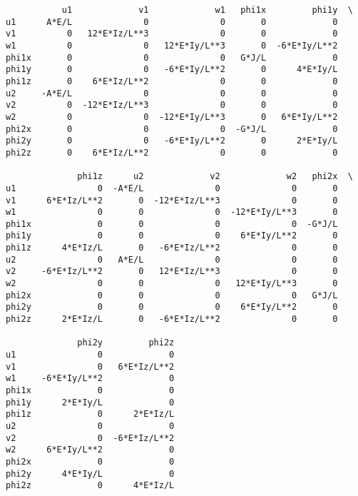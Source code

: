 \documentclass[12pt,fleqn]{article}\usepackage{../../common}
\begin{document}
\begin{verbatim}
           u1             v1             w1   phi1x         phi1y  \
u1      A*E/L              0              0       0             0   
v1          0   12*E*Iz/L**3              0       0             0   
w1          0              0   12*E*Iy/L**3       0  -6*E*Iy/L**2   
phi1x       0              0              0   G*J/L             0   
phi1y       0              0   -6*E*Iy/L**2       0      4*E*Iy/L   
phi1z       0    6*E*Iz/L**2              0       0             0   
u2     -A*E/L              0              0       0             0   
v2          0  -12*E*Iz/L**3              0       0             0   
w2          0              0  -12*E*Iy/L**3       0   6*E*Iy/L**2   
phi2x       0              0              0  -G*J/L             0   
phi2y       0              0   -6*E*Iy/L**2       0      2*E*Iy/L   
phi2z       0    6*E*Iz/L**2              0       0             0   

              phi1z      u2             v2             w2   phi2x  \
u1                0  -A*E/L              0              0       0   
v1      6*E*Iz/L**2       0  -12*E*Iz/L**3              0       0   
w1                0       0              0  -12*E*Iy/L**3       0   
phi1x             0       0              0              0  -G*J/L   
phi1y             0       0              0    6*E*Iy/L**2       0   
phi1z      4*E*Iz/L       0   -6*E*Iz/L**2              0       0   
u2                0   A*E/L              0              0       0   
v2     -6*E*Iz/L**2       0   12*E*Iz/L**3              0       0   
w2                0       0              0   12*E*Iy/L**3       0   
phi2x             0       0              0              0   G*J/L   
phi2y             0       0              0    6*E*Iy/L**2       0   
phi2z      2*E*Iz/L       0   -6*E*Iz/L**2              0       0   

              phi2y         phi2z  
u1                0             0  
v1                0   6*E*Iz/L**2  
w1     -6*E*Iy/L**2             0  
phi1x             0             0  
phi1y      2*E*Iy/L             0  
phi1z             0      2*E*Iz/L  
u2                0             0  
v2                0  -6*E*Iz/L**2  
w2      6*E*Iy/L**2             0  
phi2x             0             0  
phi2y      4*E*Iy/L             0  
phi2z             0      4*E*Iz/L  
\end{verbatim}
\end{document}
